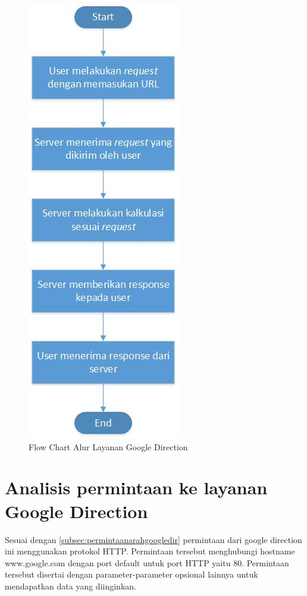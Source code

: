 			\begin{figure}[H]
				\centering		
				\includegraphics[scale=0.7]{Gambar/flowchartgoogledir.jpg}
				\caption[Flow Chart Alur Layanan Google Direction]{Flow Chart Alur Layanan Google Direction}
				\label{fig:flowchartgoogledir}	
			\end{figure}
			
\section{Analisis permintaan ke layanan Google Direction}
\label{sec:analisisrequestgoogledir}

Sesuai dengan \ref{subsec:permintaanarahgoogledir} permintaan dari google direction ini menggunakan protokol HTTP. Permintaan tersebut menghubungi hostname www.google.com dengan port default untuk port HTTP yaitu 80. Permintaan tersebut disertai dengan parameter-parameter opsional lainnya untuk mendapatkan data yang diinginkan.

